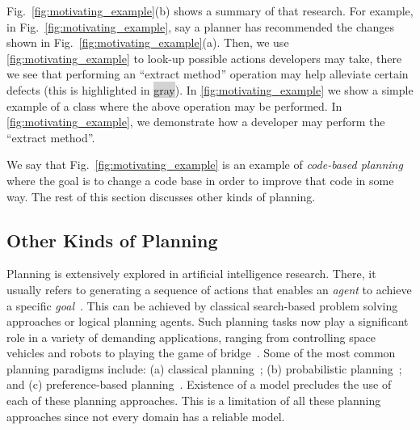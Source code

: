 \documentclass[smallextended]{svjour3}       %
\newcommand{\fig}[1]{Fig.~\ref{fig:#1}}
\begin{document}
\fig{motivating_example}(b) shows a summary of
that research. 
For example, in \fig{motivating_example}, say a planner has recommended the changes shown in \fig{motivating_example}(a). Then, we use \ref{fig:motivating_example}\protect{} to look-up possible actions developers may take, there we see that performing an ``extract method'' operation may help alleviate certain defects (this is highlighted in {\colorbox{lightgray}{gray}}). In \ref{fig:motivating_example}\protect{} we show a simple example of a class where the above operation may be performed. In \ref{fig:motivating_example}\protect{}, we demonstrate how a developer may perform the ``extract method''. 


 
We say that \fig{motivating_example} is an example of {\em code-based planning} where the goal is to change a code base in order to improve that code in some way. The rest of this section discusses other kinds of planning.

\subsection{Other Kinds of Planning}
\label{sect:planners}
Planning is extensively explored in artificial intelligence research. There, it usually refers to generating a sequence of actions that enables an \textit{agent} to achieve a specific \textit{goal}~\cite{norvig}. This can be achieved by classical search-based problem solving approaches or logical planning agents. Such planning tasks now play a significant role in a variety of demanding applications, ranging from controlling space vehicles and robots to playing the game of bridge~\cite{ghallab04}. Some of the most common planning paradigms include: (a) classical planning~\cite{wooldridge95}; (b) probabilistic planning~\cite{Bel, altman99, guo2009}; and (c) preference-based planning~\cite{son06, baier09}. Existence of a model precludes the use of each of these planning approaches. This is a limitation of all these planning approaches since not every domain has a reliable model. 
\end{document}
